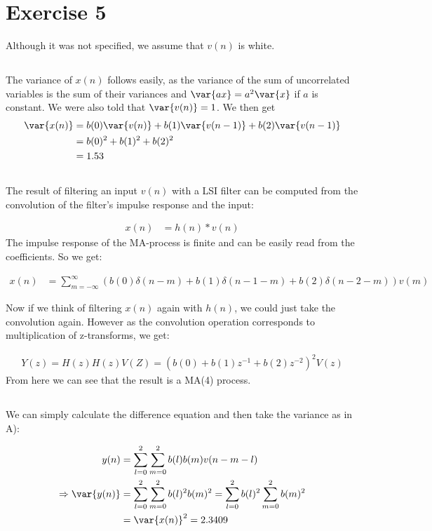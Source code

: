 
\section*{Exercise 5}

Although it was not specified, we assume that $v(n)$ is white.

\subsection{}
The variance of $x(n)$ follows easily, as the variance of the sum
of uncorrelated variables is the sum of their variances and $\var{ax}=a^2\var{x}$
if $a$ is constant. We were also told that $\var{v(n)}=1$. We then get
\begin{align}
	\var{x(n)}&=b(0)\var{v(n)}+b(1)\var{v(n-1)}+b(2)\var{v(n-1)}\\
	&=b(0)^2+b(1)^2+b(2)^2\\
	&=1.53
\end{align}


\subsection{}

The result of filtering an input $v(n)$ with a LSI filter
can be computed from the convolution of the filter's impulse
response and the input:

\begin{align}
	x(n)&=h(n)*v(n)	
\end{align}
The impulse response of the MA-process is finite and
can be easily read from the coefficients. So we get:

\begin{align}
	x(n)&=\sum_{m=-\infty}^\infty \left(b(0)\delta(n-m)+b(1)\delta(n-1-m)+b(2)\delta(n-2-m)\right)v(m)	
\end{align}

Now if we think of filtering $x(n)$ again with $h(n)$, we could just
take the convolution again. However as the convolution operation
corresponds to multiplication of z-transforms, we get:

\begin{align}
	Y(z)=H(z)H(z)V(Z)=\left(b(0)+b(1)z^{-1}+b(2)z^{-2}\right)^2V(z)	
\end{align}
From here we can see that the result is a MA(4) process.

\subsection{}

We can simply calculate the difference equation and then
take the variance as in A):

\begin{align}
	y(n)&=\sum_{l=0}^2\sum_{m=0}^2 b(l)b(m)v(n-m-l)\\
	\Rightarrow \var{y(n)} &= \sum_{l=0}^2\sum_{m=0}^2 b(l)^2b(m)^2=\sum_{l=0}^2b(l)^2 \sum_{m=0}^2 b(m)^2\\
	&=\var{x(n)}^2=2.3409	
\end{align}
